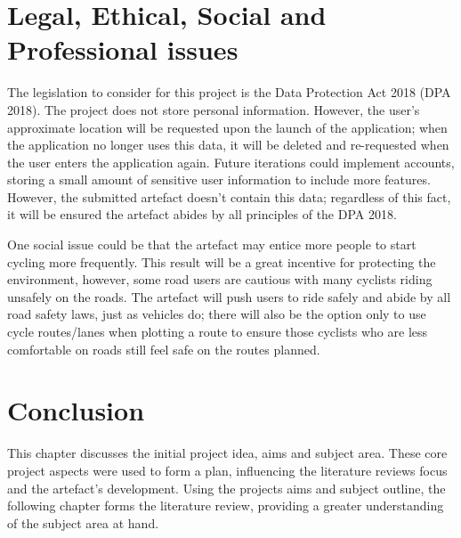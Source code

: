 \clearpage
\section{Legal, Ethical, Social and Professional issues}
\label{intro:legal...issues}

The legislation to consider for this project is the Data Protection Act 2018 (DPA 2018). The project does not store personal information. However, the user’s approximate location will be requested upon the launch of the application; when the application no longer uses this data, it will be deleted and re-requested when the user enters the application again. Future iterations could implement accounts, storing a small amount of sensitive user information to include more features. However, the submitted artefact doesn't contain this data; regardless of this fact, it will be ensured the artefact abides by all principles of the DPA 2018.

One social issue could be that the artefact may entice more people to start cycling more frequently. This result will be a great incentive for protecting the environment, however, some road users are cautious with many cyclists riding unsafely on the roads. The artefact will push users to ride safely and abide by all road safety laws, just as vehicles do; there will also be the option only to use cycle routes/lanes when plotting a route to ensure those cyclists who are less comfortable on roads still feel safe on the routes planned.

\section{Conclusion}
\label{intro:conclusion}

This chapter discusses the initial project idea, aims and subject area. These core project aspects were used to form a plan, influencing the literature reviews focus and the artefact's development. Using the projects aims and subject outline, the following chapter forms the literature review, providing a greater understanding of the subject area at hand.